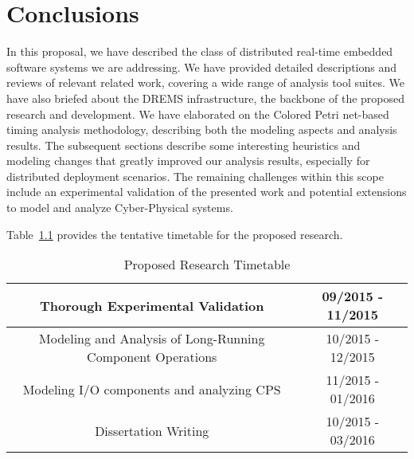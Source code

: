 \chapter{Conclusions}

In this proposal, we have described the class of distributed real-time embedded software systems we are addressing. We have provided detailed descriptions and reviews of relevant related work, covering a wide range of analysis tool suites. We have also briefed about the DREMS infrastructure, the backbone of the proposed research and development. We have elaborated on the Colored Petri net-based timing analysis methodology, describing both the modeling aspects and analysis results. The subsequent sections describe some interesting  heuristics and modeling changes that greatly improved our analysis results, especially for distributed deployment scenarios. The remaining challenges within this scope include an experimental validation of the presented work and potential extensions to model and analyze Cyber-Physical systems. 

Table~\ref{table:timeline} provides the tentative timetable for the proposed research.
\begin{table}[h]
	\caption{Proposed Research Timetable}
	\centering
	\begin{tabular}{| c | c |}
		\hline
		Thorough Experimental Validation & 09/2015 - 11/2015 \\\hline
		Modeling and Analysis of Long-Running Component Operations & 10/2015 - 12/2015 \\\hline
		Modeling I/O components and analyzing CPS & 11/2015 - 01/2016 \\\hline
		Dissertation Writing & 10/2015 - 03/2016 \\\hline
	\end{tabular}
	\label{table:timeline}
\end{table}